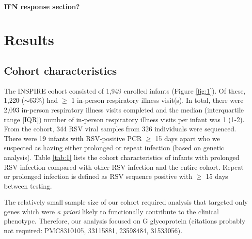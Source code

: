 \documentclass{article} %
\begin{document}
\paragraph{IFN response section?}

\section{Results}
\subsection{Cohort characteristics}
The INSPIRE cohort consisted of 1,949 enrolled infants 
(Figure \ref{fig:1}).
Of these, 1,220 ($\sim 63\%$) had $\ge$ 1 in-person respiratory illness visit(s). 
In total, there were 2,093 in-person respiratory illness visits completed and the median (interquartile range [IQR]) number of in-person respiratory illness visits per infant was 1 (1-2). 
From the cohort, 344 RSV viral samples from 326 individuals were sequenced.
There were 19 infants with RSV-positive PCR $\ge$ 15 days apart who we suspected as having either prolonged or repeat infection (based on genetic analysis).
Table \ref{tab:1} lists the cohort characteristics of infants with prolonged RSV infection compared with other RSV infection and the entire cohort. 
Repeat or prolonged infection is defined as RSV sequence positive with $\ge$ 15 days between testing.

The relatively small sample size of our cohort required analysis that targeted only genes which were \textit{a priori} likely to functionally contribute to the clinical phenotype. 
Therefore, our analysis focused on G glycoprotein (citations probably not required: PMC8310105, 33115881, 23598484, 31533056).
\end{document}
